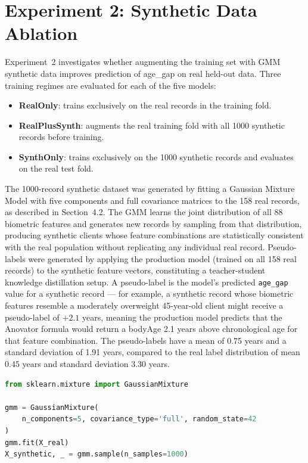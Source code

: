 \documentclass[11pt,a4paper]{report}
\begin{document}
\section{Experiment 2: Synthetic Data Ablation}

Experiment~2 investigates whether augmenting the training set with GMM synthetic data improves
prediction of age\_gap on real held-out data. Three training regimes are evaluated for each of the
five models:

\begin{itemize}
  \item \textbf{RealOnly}: trains exclusively on the real records in the training fold.
  \item \textbf{RealPlusSynth}: augments the real training fold with all 1000 synthetic records
    before training.
  \item \textbf{SynthOnly}: trains exclusively on the 1000 synthetic records and evaluates on the
    real test fold.
\end{itemize}

The 1000-record synthetic dataset was generated by fitting a Gaussian Mixture Model with five
components and full covariance matrices to the 158 real records, as described in Section~4.2. The
GMM learns the joint distribution of all 88 biometric features and generates new records by sampling
from that distribution, producing synthetic clients whose feature combinations are statistically
consistent with the real population without replicating any individual real record. Pseudo-labels were generated by
applying the production model (trained on all 158 real records) to the synthetic feature vectors,
constituting a teacher-student knowledge distillation setup. A pseudo-label is the model's
predicted \texttt{age\_gap} value for a synthetic record --- for example, a synthetic record whose
biometric features resemble a moderately overweight 45-year-old client might receive a pseudo-label
of $+2.1$ years, meaning the production model predicts that the Anovator formula would return a
bodyAge 2.1 years above chronological age for that feature combination. The pseudo-labels have a mean of
0.75 years and a standard deviation of 1.91 years, compared to the real label distribution of mean
0.45 years and standard deviation 3.30 years.

\begin{lstlisting}[language=Python, caption={GMM initialisation and synthetic population generation.}, label={lst:gmm}]
from sklearn.mixture import GaussianMixture

gmm = GaussianMixture(
    n_components=5, covariance_type='full', random_state=42
)
gmm.fit(X_real)
X_synthetic, _ = gmm.sample(n_samples=1000)
\end{lstlisting}
\end{document}
